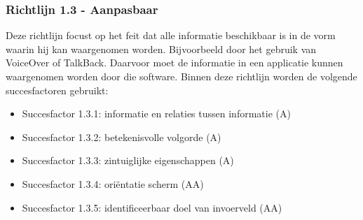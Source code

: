 

\subsubsection{Richtlijn 1.3 - Aanpasbaar}
Deze richtlijn focust op het feit dat alle informatie beschikbaar is in de vorm waarin hij kan waargenomen worden. Bijvoorbeeld door het gebruik van VoiceOver of TalkBack. Daarvoor moet de informatie in een applicatie kunnen waargenomen worden door die software. Binnen deze richtlijn worden de volgende succesfactoren gebruikt: \begin{itemize}
    \item Succesfactor 1.3.1: informatie en relaties tussen informatie (A)
    \item Succesfactor 1.3.2: betekenisvolle volgorde (A)
        \item Succesfactor 1.3.3: zintuiglijke eigenschappen (A)
              \item Succesfactor 1.3.4: oriëntatie scherm (AA)
              \item Succesfactor 1.3.5: identificeerbaar doel van invoerveld (AA)
\end{itemize}

